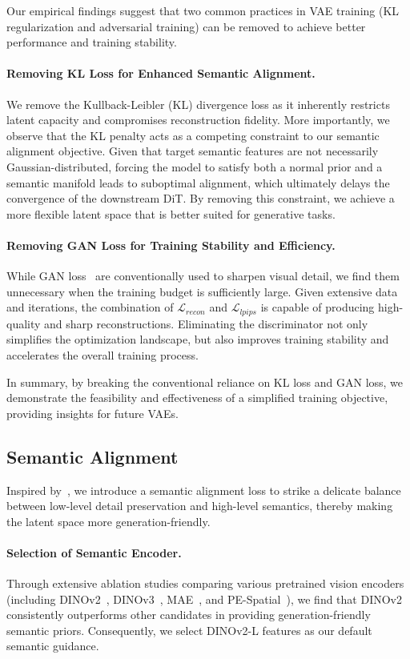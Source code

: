 \documentclass{llmxive}
\begin{document}
Our empirical findings suggest that two common practices in VAE training (KL regularization and adversarial training) can be removed to achieve better performance and training stability.

\paragraph{Removing KL Loss for Enhanced Semantic Alignment.} 
We remove the Kullback-Leibler (KL) divergence loss as it inherently restricts latent capacity and compromises reconstruction fidelity. More importantly, we observe that the KL penalty acts as a competing constraint to our semantic alignment objective. Given that target semantic features are not necessarily Gaussian-distributed, forcing the model to satisfy both a normal prior and a semantic manifold leads to suboptimal alignment, which ultimately delays the convergence of the downstream DiT. By removing this constraint, we achieve a more flexible latent space that is better suited for generative tasks.

\paragraph{Removing GAN Loss for Training Stability and Efficiency.} 
While GAN loss~\citep{gan} are conventionally used to sharpen visual detail, we find them unnecessary when the training budget is sufficiently large. Given extensive data and iterations, the combination of $\mathcal{L}_{recon}$ and $\mathcal{L}_{lpips}$ is capable of producing high-quality and sharp reconstructions. Eliminating the discriminator not only simplifies the optimization landscape, but also improves training stability and accelerates the overall training process.

In summary, by breaking the conventional reliance on KL loss and GAN loss, we demonstrate the feasibility and effectiveness of a simplified training objective, providing insights for future VAEs.

\subsection{Semantic Alignment}\label{sec:align}
Inspired by~\citet{vavae}, we introduce a semantic alignment loss to strike a delicate balance between low-level detail preservation and high-level semantics, thereby making the latent space more generation-friendly.

\paragraph{Selection of Semantic Encoder.}
Through extensive ablation studies comparing various pretrained vision encoders (including DINOv2~\citep{dinov2}, DINOv3~\citep{dinov3}, MAE~\citep{mae}, and PE-Spatial~\citep{bolya2025perception}), we find that DINOv2 consistently outperforms other candidates in providing generation-friendly semantic priors. Consequently, we select DINOv2-L features as our default semantic guidance.
\end{document}
